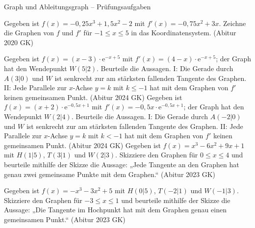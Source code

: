 \begin{aufgabe}{Graph und Ableitungsgraph – Prüfungsaufgaben}
\begin{teile}
\teil Gegeben ist $f(x) = -0{,}25x^3 + 1{,}5x^2 - 2$ mit $f'(x) = -0{,}75x^2 + 3x$. Zeichne die Graphen von $f$ und $f'$ für $-1 \le x \le 5$ in das Koordinatensystem. \hfill (Abitur 2020 GK)

\begin{ksys}[xmin=-1,xmax=5,ymin=-4,ymax=7]  \end{ksys}
\teil Gegeben ist $f(x) = (x - 3) \cdot \mathrm{e}^{-x + 5}$ mit $f'(x) = (4 - x) \cdot \mathrm{e}^{-x + 5}$; der Graph hat den Wendepunkt $W(5 | 2)$. Beurteile die Aussagen. I: Die Gerade durch $A(3 | 0)$ und $W$ ist senkrecht zur am stärksten fallenden Tangente des Graphen. II: Jede Parallele zur $x$-Achse $y = k$ mit $k \le -1$ hat mit dem Graphen von $f'$ keinen gemeinsamen Punkt. \hfill (Abitur 2024 GK)
\teil Gegeben ist $f(x) = (x + 2) \cdot \mathrm{e}^{-0{,}5x + 1}$ mit $f'(x) = -0{,}5x \cdot \mathrm{e}^{-0{,}5x + 1}$; der Graph hat den Wendepunkt $W(2 | 4)$. Beurteile die Aussagen. I: Die Gerade durch $A(-2 | 0)$ und $W$ ist senkrecht zur am stärksten fallenden Tangente des Graphen. II: Jede Parallele zur $x$-Achse $y = k$ mit $k < -1$ hat mit dem Graphen von $f'$ keinen gemeinsamen Punkt. \hfill (Abitur 2024 GK)
\teil Gegeben ist $f(x) = x^3 - 6x^2 + 9x + 1$ mit $H(1 | 5)$, $T(3 | 1)$ und $W(2 | 3)$. Skizziere den Graphen für $0 \le x \le 4$ und beurteile mithilfe der Skizze die Aussage: „Jede Tangente an den Graphen hat genau zwei gemeinsame Punkte mit dem Graphen.“ \hfill (Abitur 2023 GK)

\begin{ksys}[xmin=-1,xmax=5,ymin=-1,ymax=6]  \end{ksys}
\teil Gegeben ist $f(x) = -x^3 - 3x^2 + 5$ mit $H(0 | 5)$, $T(-2 | 1)$ und $W(-1 | 3)$. Skizziere den Graphen für $-3 \le x \le 1$ und beurteile mithilfe der Skizze die Aussage: „Die Tangente im Hochpunkt hat mit dem Graphen genau einen gemeinsamen Punkt.“ \hfill (Abitur 2023 GK)

\begin{ksys}[xmin=-4,xmax=2,ymin=-1,ymax=6]  \end{ksys}
\end{teile}
\end{aufgabe}

